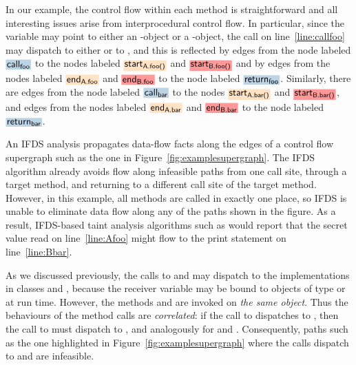 In our example, the control flow within each method is straightforward and
all interesting issues arise from interprocedural control flow. In particular,
since the variable  may point to either an -object or a -object, 
the call on line~\ref{line:callfoo} may dispatch to either  or to ,
and this is reflected by edges  
  from the node labeled $\highlight{\code{call}_\code{foo}}{greyblue}$ to the nodes labeled
  $\highlight{\code{start}_\code{A.foo()}}{bisque}$ and $\highlight{\code{start}_\code{B.foo()}}{lightsalmonpink}$
and by edges
  from the nodes labeled $\highlight{\code{end}_\code{A.foo}}{bisque}$ and $\highlight{\code{end}_\code{B.foo}}{lightsalmonpink}$ 
  to the node labeled  $\highlight{\code{return}_\code{foo}}{greyblue}$.  
Similarly, there are edges from the node labeled $\highlight{\code{call}_\code{bar}}{greyblue}$ to the nodes 
$\highlight{\code{start}_\code{A.bar()}}{bisque}$ and $\highlight{\code{start}_\code{B.bar()}}{lightsalmonpink}$, and 
edges
  from the nodes labeled $\highlight{\code{end}_\code{A.bar}}{bisque}$ and $\highlight{\code{end}_\code{B.bar}}{lightsalmonpink}$ 
  to the node labeled  $\highlight{\code{return}_\code{bar}}{greyblue}$. 
 
An IFDS analysis propagates data-flow facts along the edges
of a control flow supergraph such as the one in Figure~\ref{fig:examplesupergraph}. The
IFDS algorithm already avoids flow along infeasible paths from one call site, through a target method,
and returning to a different call site of the target method.
However, in this example, all methods are
called in exactly one place, so IFDS is unable to eliminate data flow along any of the
paths shown in the figure. As a result, IFDS-based taint analysis algorithms such as
\cite{DBLP:conf/issta/GuarnieriPTDTB11,DBLP:conf/pldi/ArztRFBBKTOM14} would report 
that the secret value read on line~\ref{line:Afoo}
might flow to the print statement on line~\ref{line:Bbar}. 

As we discussed previously, the calls to  and  may dispatch
to the implementations in classes  and , 
because the receiver variable  may be bound to
 objects of type  or  at run time. 
However, the methods  and  are invoked
on \textit{the same object}. Thus the behaviours of the method calls
are \textit{correlated}: if the call to  dispatches to ,
then the call to  must dispatch to , and analogously
for  and .
Consequently, paths such as the one highlighted in
Figure~\ref{fig:examplesupergraph} where the calls dispatch to
 and 
are infeasible.  

